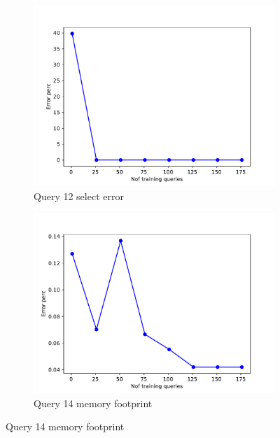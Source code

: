 \begin{figure}[!htb]
   \begin{subfigure}[t]{0.5\textwidth}
     \includegraphics[scale=0.4]{figs/tpch10/tpch10_sel12_error.pdf}
     \caption{Query 12 select error}
     \label{fig:tpch_sel12}
   \end{subfigure}
   \begin{subfigure}[t]{0.5\textwidth}
     \includegraphics[scale=0.4]{figs/tpch10/tpch10_sel14_error.pdf}
     \caption{Query 14 memory footprint}
     \label{fig:tpch_sel14}
    \end{subfigure}


\end{figure}
